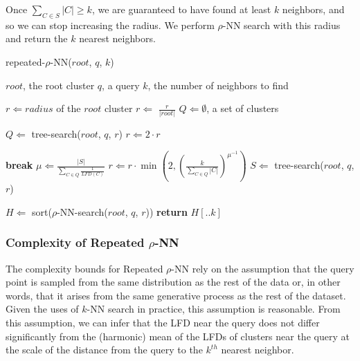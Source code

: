 Once $\sum_{C \in S} |C| \geq k$, we are guaranteed to have found at least $k$ neighbors, and so we can stop increasing the radius.
We perform $\rho$-NN search with this radius and return the $k$ nearest neighbors.

\begin{algorithm} %
    \caption{repeated-$\rho$-NN($root$, $q$, $k$)} %
    \label{alg:methods:repeated-rnn} %
    \begin{algorithmic} %
        \REQUIRE $root$, the root cluster
        \REQUIRE $q$, a query
        \REQUIRE $k$, the number of neighbors to find

        \STATE $r \Leftarrow radius$ of the $root$ cluster
        \STATE $r \Leftarrow$ $\frac{r}{|root|}$
        \STATE $Q \Leftarrow \emptyset$, a set of clusters

            \STATE $Q \Leftarrow$ tree-search($root$, $q$, $r$)
            \STATE $r \Leftarrow 2 \cdot r$
        \ENDWHILE

        \ALOOP{}
                \STATE \textbf{break}
            \ENDIF
            \STATE $\mu \Leftarrow \frac{|S|}{\sum_{C \in Q} \frac{1}{LFD(C)}}$
            \STATE $r \Leftarrow r \cdot \min \left( 2, \left( {\frac{k}{\sum_{C \in Q} |C|}} \right)^{\mu^{-1}} \right)$
            \STATE $S \Leftarrow$ tree-search($root$, $q$, $r$)
        \ENDLOOP

        \STATE $H \Leftarrow$ sort($\rho$-NN-search($root$, $q$, $r$))
        \STATE \textbf{return} $H[.. k]$
    \end{algorithmic}
\end{algorithm}


\subsubsection{Complexity of Repeated \texorpdfstring{$\rho$}{p}-NN}
\label{sec:methods:knn-search:repeated-rnn-complexity}

The complexity bounds for Repeated $\rho$-NN rely on the assumption that the query point is sampled from the same distribution as the rest of the data or, in other words, that it arises from the same generative process as the rest of the dataset.
Given the uses of $k$-NN search in practice, this assumption is reasonable.
From this assumption, we can infer that the LFD near the query does not differ significantly from the (harmonic) mean of the LFDs of clusters near the query at the scale of the distance from the query to the $k^{th}$ nearest neighbor.

